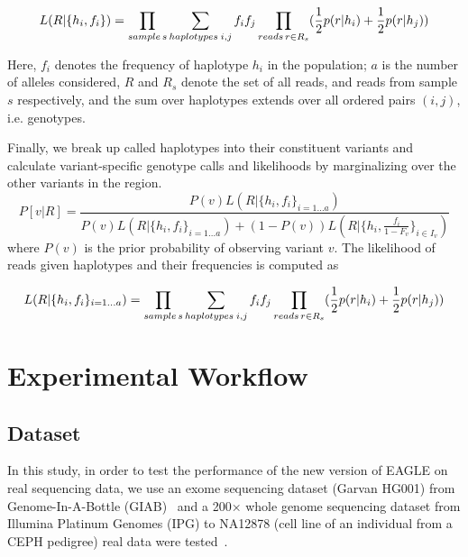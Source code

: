 \documentclass[PhD]{PHlab-thesis}
\begin{document}
\begin{equation}
  L(R|\{ {h_i,f_i} \}) = \prod_{sample \hspace{0.5mm} s}\sum_{haplotypes \hspace{0.75mm} i,j} {f_if_j} \prod_{reads \hspace{0.5mm} r \in R_s} (\frac{1}{2}p(r|h_i) + \frac{1}{2} p(r|h_j))
\end{equation}

Here, $f_i$ denotes the frequency of \hspace{0.05mm} haplotype $h_i$ in the population; $a$ is the number of alleles considered, $R$ and $R_s$ denote the set of all reads, and reads from sample $s$ respectively, and the sum over haplotypes extends over all ordered pairs $(i,j)$, i.e. genotypes.

Finally, we break up called haplotypes into their constituent variants and calculate variant-specific genotype calls and likelihoods by marginalizing over the other variants in the region.
\begin{equation}
  P[v|R] = \frac{P(v)L(R| \{ {h_i,f_i} \} _{i=1...a})}        {P(v)L(R| \{ {h_i,f_i} \}_{i=1...a})+(1-P(v))L(R|\{ {h_i,\frac{f_i}{1-F_v} \} _{i\in I_v}})}
\end{equation}
where $P(v)$ is the prior probability of observing variant $v$. The likelihood of reads given haplotypes and their frequencies is computed as

\begin{equation}
  L(R|\{ {h_i,f_i} \}_{i=1...a}) = \prod_{sample \hspace{0.5mm} s}\sum_{haplotypes \hspace{0.75mm} i,j} {f_if_j} \prod_{reads \hspace{0.5mm} r \in R_s} (\frac{1}{2}p(r|h_i) + \frac{1}{2} p(r|h_j))
\end{equation}

\chapter{Experimental Workflow}
\section{Dataset}
In this study, in order to test the performance of the new version of EAGLE on real sequencing data, we use an exome sequencing dataset (Garvan HG001) from Genome-In-A-Bottle (GIAB)~\cite{Zook2014GIAB} and a 200× whole genome sequencing dataset from Illumina Platinum Genomes (IPG) to NA12878 (cell line of an individual from a CEPH pedigree) real data were tested~\cite{Eberle2021IPG}.
\end{document}
